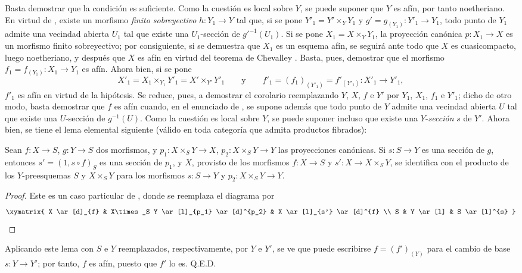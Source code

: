 Basta demostrar que la condición es suficiente.
Como la cuestión es local sobre $Y$, se puede suponer que $Y$ es afín, por tanto noetheriano.
En virtud de , existe un morfismo \emph{finito sobreyectivo} $h:Y_1\to Y$ tal que, si se pone $Y'_1=Y'\times_Y Y_1$ y $g'=g_{(Y_1)}:Y'_1\to Y_1$, todo punto de $Y_1$ admite una vecindad abierta $U_1$ tal que existe una $U_1$-sección de $g'^{-1}(U_1)$.
Si se pone $X_1=X\times_Y Y_1$, la proyección canónica $p:X_1\to X$ es un morfismo finito sobreyectivo; por consiguiente, si se demuestra que $X_1$ es un esquema afín, se seguirá ante todo que $X$ es cuasicompacto, luego noetheriano, y después que $X$ es afín en virtud del teorema de Chevalley .
Basta, pues, demostrar que el morfismo $f_1=f_{(Y_1)}:X_1\to Y_1$ es afín.
Ahora bien, si se pone
\[
  X'_1=X_1\times_{Y_1}Y'_1=X'\times_{Y'}Y'_1
  \qquad\text{y}\qquad
  f'_1=(f_1)_{(Y'_1)}=f'_{(Y'_1)}:X'_1\to Y'_1,
\]
$f'_1$ es afín en virtud de la hipótesis.
Se reduce, pues, a demostrar el corolario reemplazando $Y$, $X$, $f$ e $Y'$ por $Y_1$, $X_1$, $f_1$ e $Y'_1$; dicho de otro modo, basta demostrar que $f$ es afín cuando, en el enunciado de , se supone además que todo punto de $Y$ admite una vecindad abierta $U$ tal que existe una $U$-sección de $g^{-1}(U)$.
Como la cuestión es local sobre $Y$, se puede suponer incluso que existe una $Y$-\emph{sección} $s$ de $Y'$.
Ahora bien, se tiene el lema elemental siguiente (válido en toda categoría que admita productos fibrados):

\begin{lemma}[14.5.11.1]
\label{IV.14.5.11.1}
Sean $f:X\to S$, $g:Y\to S$ dos morfismos, y $p_1:X\times_S Y\to X$, $p_2:X\times_S Y\to Y$ las proyecciones canónicas.
Si $s:S\to Y$ es una sección de $g$, entonces $s'=(1,s\circ f)_S$ es una sección de $p_1$, y $X$, provisto de los morfismos $f:X\to S$ y $s':X\to X\times_S Y$, se identifica con el producto de los $Y$-preesquemas $S$ y $X\times_S Y$ para los morfismos $s:S\to Y$ y $p_2:X\times_S Y\to Y$.
\end{lemma}


\begin{proof}
Este es un caso particular de , donde se reemplaza el diagrama por
\[
  \xymatrix{
    X \ar[d]_{f} & X\times_S Y \ar[l]_{p_1} \ar[d]^{p_2} & X \ar[l]_{s'} \ar[d]^{f} \\
    S & Y \ar[l] & S \ar[l]^{s}
  }
\]
\end{proof}
\noindent Aplicando este lema con $S$ e $Y$ reemplazados, respectivamente, por $Y$ e $Y'$, se ve que puede escribirse $f=(f')_{(Y)}$ para el cambio de base $s:Y\to Y'$; por tanto, $f$ es afín, puesto que $f'$ lo es.
Q.E.D.

